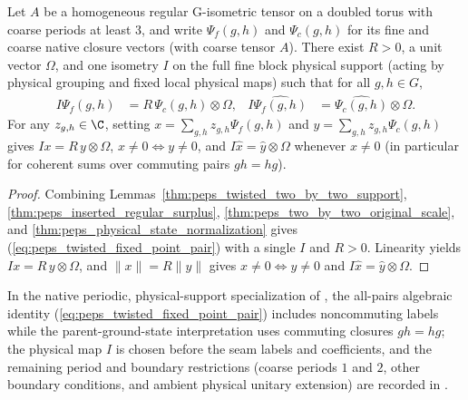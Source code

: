 \begin{lemma}%
    \label{thm:peps_twisted_two_by_two_fixed_point}
    \leanok
    Let $A$ be a homogeneous regular G-isometric tensor on a doubled torus with
    coarse periods at least $3$, and write $\Psi_f(g,h)$ and $\Psi_c(g,h)$ for
    its fine and coarse native closure vectors (with coarse tensor $A$). There
    exist $R>0$, a unit vector $\Omega$, and one isometry $I$ on the full fine
    block physical support (acting by physical grouping and fixed local
    physical maps) such that for all $g,h\in G$,
    \begin{align}
        I\Psi_f(g,h) & =R\,\Psi_c(g,h)\otimes\Omega,
                     & I\widehat{\Psi_f(g,h)}        & =\widehat{\Psi_c(g,h)}\otimes\Omega.
        \label{eq:peps_twisted_fixed_point_pair}
    \end{align}
    For any $z_{g,h}\in\C$, setting $x=\sum_{g,h}z_{g,h}\Psi_f(g,h)$ and
    $y=\sum_{g,h}z_{g,h}\Psi_c(g,h)$ gives $Ix=R\,y\otimes\Omega$,
    $x\ne0\iff y\ne0$, and $I\widehat x=\widehat y\otimes\Omega$ whenever
    $x\ne0$ (in particular for coherent sums over commuting pairs $gh=hg$).
\end{lemma}
\begin{proof}\leanok
    Combining Lemmas~\ref{thm:peps_twisted_two_by_two_support},
    \ref{thm:peps_inserted_regular_surplus},
    \ref{thm:peps_two_by_two_original_scale}, and
    \ref{thm:peps_physical_state_normalization} gives
    (\ref{eq:peps_twisted_fixed_point_pair}) with a single $I$ and $R>0$.
    Linearity yields $Ix=R\,y\otimes\Omega$, and $\|x\|=R\|y\|$ gives
    $x\ne0\iff y\ne0$ and $I\widehat x=\widehat y\otimes\Omega$.
\end{proof}

In the native periodic, physical-support specialization of
\cite[Observation~6.6]{Schuch2010PEPS}, the all-pairs algebraic identity
(\ref{eq:peps_twisted_fixed_point_pair}) includes noncommuting labels while the
parent-ground-state interpretation uses commuting closures $gh=hg$; the
physical map $I$ is chosen before the seam labels and coefficients, and the
remaining period and boundary restrictions (coarse periods $1$ and $2$, other
boundary conditions, and ambient physical unitary extension) are recorded in
\cite{gap:scp10_twisted_two_by_two_regular_fixed_point}.
